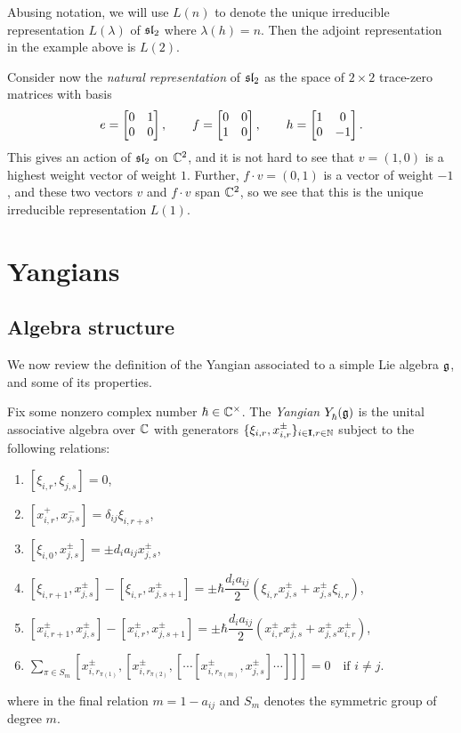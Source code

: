 Abusing notation, we will use $L(n)$ to denote the unique irreducible representation $L(\lambda)$ of $\mathfrak{sl}_2$ where $\lambda(h)=n$.
Then the adjoint representation in the example above is $L(2)$.

\begin{example}\label{E:sl2-C2}
    Consider now the \emph{natural representation} of $\mathfrak{sl}_2$ as the space of $2\times 2$ trace-zero matrices with basis
    \[e = \bmat{0 & 1 \\ 0 & 0}, \qquad f=\bmat{0 & 0 \\ 1 & 0}, \qquad h=\bmat{1 & 0 \\ 0 & -1}.\]
    This gives an action of $\mathfrak{sl}_2$ on $\mathbb{C}^2$, and it is not hard to see that $v=(1,0)$ is a highest weight vector of weight $1$.
    Further, $f\cdot v = (0,1)$ is a vector of weight $-1$, and these two vectors $v$ and $f\cdot v$ span $\mathbb{C}^2$, so we see that this is the unique irreducible representation $L(1)$.
\end{example}


\section{Yangians}

\subsection{Algebra structure}

We now review the definition of the Yangian associated to a simple Lie algebra $\mathfrak{g}$, and some of its properties.

\begin{definition}\label{D:Y}
    Fix some nonzero complex number $\hbar\in\mathbb{C}^\times$.
    The \emph{Yangian} $Y_\hbar^{}(\mathfrak{g})$ is the unital associative algebra over $\mathbb{C}$ with generators $\{\xi_{i,r}, x^\pm_{i,r}\}_{i\in\mathbf{I},r\in\mathbb{N}}$ subject to the following relations:
    \begin{enumerate}
        \item $[\xi_{i,r},\xi_{j,s}] = 0$,
        \item $[x^+_{i,r},x^-_{j,s}] = \delta_{ij}\xi_{i,r+s}$,
        \item $[\xi_{i,0},x^\pm_{j,s}] = \pm d_ia_{ij}x^\pm_{j,s}$,
        \item $[\xi_{i,r+1},x^\pm_{j,s}]-[\xi_{i,r},x^\pm_{j,s+1}] = \pm\hbar\dfrac{d_ia_{ij}}{2}(\xi_{i,r}x^\pm_{j,s}+x^\pm_{j,s}\xi_{i,r})$,
        \item $[x^\pm_{i,r+1},x^\pm_{j,s}]-[x^\pm_{i,r},x^\pm_{j,s+1}] = \pm\hbar\dfrac{d_ia_{ij}}{2}(x^\pm_{i,r}x^\pm_{j,s}+x^\pm_{j,s}x^\pm_{i,r})$,
        \item $\displaystyle\sum\limits_{\pi\in S_m}[x^\pm_{i,r_{\pi(1)}}, [x^\pm_{i,r_{\pi(2)}}, [\cdots[x^\pm_{i,r_{\pi(m)}}, x^\pm_{j,s}]\cdots]]]=0 \quad\text{if } i\neq j$.
    \end{enumerate}
    where in the final relation $m=1-a_{ij}$ and $S_m$ denotes the symmetric group of degree $m$.
\end{definition}

